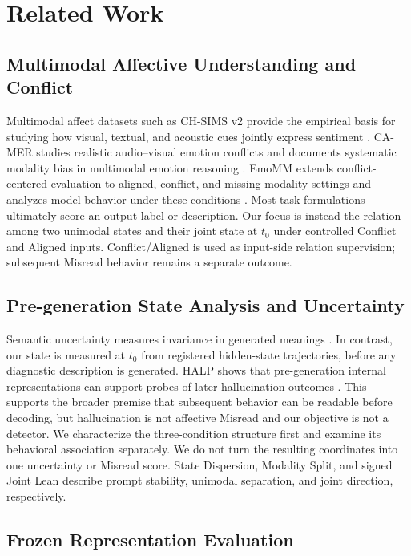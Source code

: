 \section{Related Work}

\subsection{Multimodal Affective Understanding and Conflict}

Multimodal affect datasets such as CH-SIMS v2 provide the empirical basis for studying
how visual, textual, and acoustic cues jointly express sentiment \cite{liu2022chsims}.
CA-MER studies realistic audio--visual emotion conflicts and documents systematic
modality bias in multimodal emotion reasoning \cite{han2025benchmarking}. EmoMM
extends conflict-centered evaluation to aligned, conflict, and missing-modality
settings and analyzes model behavior under these conditions \cite{sun2026emomm}.
Most task formulations ultimately score an output label or description. Our focus is
instead the relation among two unimodal states and their joint state at \(t_0\) under
controlled Conflict and Aligned inputs. Conflict/Aligned is used as input-side
relation supervision; subsequent Misread behavior remains a separate outcome.

\subsection{Pre-generation State Analysis and Uncertainty}

Semantic uncertainty measures invariance in generated meanings
\cite{kuhn2024semanticuncertainty}. In contrast, our state is measured at \(t_0\) from
registered hidden-state trajectories, before any diagnostic description is generated.
HALP shows that pre-generation internal representations can support probes of later
hallucination outcomes \cite{kogilathota-etal-2026-halp}. This supports the broader
premise that subsequent behavior can be readable before decoding, but hallucination
is not affective Misread and our objective is not a detector. We characterize the
three-condition structure first and examine its behavioral association separately.
We do not turn the resulting coordinates into one uncertainty or Misread score.
State Dispersion, Modality Split, and signed Joint Lean describe prompt stability,
unimodal separation, and joint direction, respectively.

\subsection{Frozen Representation Evaluation}

